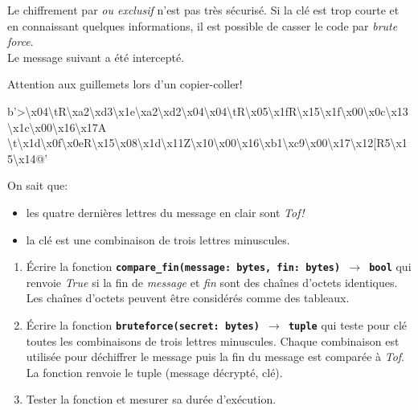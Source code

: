 \documentclass[a4paper,11pt]{article}
\begin{document}
\begin{exo}
Le chiffrement par \emph{ou exclusif} n'est pas très sécurisé. Si la clé est trop courte et en connaissant quelques informations, il est possible de casser le code par \emph{brute force}.\\Le message suivant a été intercepté.
\begin{commentprof}
Attention aux guillemets lors d'un copier-coller!
\end{commentprof}
\begin{center}
    b'>\textbackslash x04\textbackslash tR\textbackslash xa2\textbackslash xd3\textbackslash x1e\textbackslash xa2\textbackslash xd2\textbackslash x04\textbackslash x04\textbackslash tR\textbackslash x05\textbackslash x1fR\textbackslash x15\textbackslash x1f\textbackslash x00\textbackslash x0c\textbackslash x13\textbackslash x1c\textbackslash x00\textbackslash x16\textbackslash x17A\\
    \textbackslash t\textbackslash x1d\textbackslash x0f\textbackslash x0eR\textbackslash x15\textbackslash x08\textbackslash x1d\textbackslash x11Z\textbackslash x10\textbackslash x00\textbackslash x16\textbackslash xb1\textbackslash xc9\textbackslash x00\textbackslash x17\textbackslash x12[R5\textbackslash x15\textbackslash x14@'
\end{center}
On sait que:
\begin{itemize}
    \item les quatre dernières lettres du message en clair sont \emph{Tof!}
    \item la clé est une combinaison de trois lettres minuscules.
\end{itemize}
\begin{enumerate}
    \item Écrire la fonction \textbf{\texttt{compare\_fin(message: bytes, fin: bytes) $\rightarrow$ bool}} qui renvoie \emph{True} si la fin de \emph{message} et \emph{fin} sont des chaînes d'octets identiques. Les chaînes d'octets peuvent être considérés comme des tableaux.
    \item Écrire la fonction \textbf{\texttt{bruteforce(secret: bytes) $\rightarrow$ tuple}} qui teste pour clé toutes les combinaisons de trois lettres minuscules. Chaque combinaison est utilisée pour déchiffrer le message puis la fin du message est comparée à \emph{Tof}. La fonction renvoie le tuple (message décrypté, clé).
    \item Tester la fonction et mesurer sa durée d'exécution.
\end{enumerate}
\end{exo}
\end{document}
